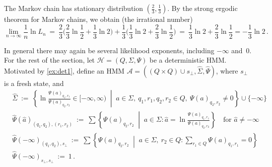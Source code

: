 \documentclass[a4paper,UKenglish,cleveref, autoref,mathscr]{lipics-v2019}
\newcommand{\1}{\mathbbm{1}}
\newcommand{\liexp}{\lim_{n\rightarrow\infty} \frac1n \ln L_n}
\newcommand{\A}{\mathcal{A}}
\renewcommand{\H}{\mathcal{H}}
\begin{document}
\begin{example}
%	
The Markov chain has stationary distribution $(\frac23, \frac13)$.
By the strong ergodic theorem for Markov chains, we obtain (the irrational number)
\[
\textstyle
\liexp \ =\ \frac23 \Big(\frac23 \ln \frac12 + \frac13 \ln 2 \Big) + \frac13 \Big(\frac13 \ln 2 + \frac23 \ln \frac12\Big) \ = \ \frac13 \ln2 + \frac23 \ln \frac12 = - \frac13 \ln2\,.
\]
\end{example}
In general there may again be several likelihood exponents, including $-\infty$ and~$0$.
For the rest of the section, let $\H = (Q,\Sigma,\Psi)$ be a deterministic HMM. %
Motivated by \cref{ex:det1}, define an HMM $\A = ((Q \times Q) \cup s_\bot, \hat\Sigma, \hat\Psi)$, where $s_\bot$ is a fresh state, and
\begin{align*}
&\hat\Sigma \ := \ \left\{\ln \frac{\Psi(a)_{q_1,r_1}}{\Psi(a)_{q_2,r_2}} \in [-\infty,\infty) \;\middle\vert\; a \in \Sigma,\ q_1,r_1,q_2,r_2 \in Q,\ \Psi(a)_{q_2,r_2} \ne 0 \right\} \cup \{-\infty\} \\
&\hat\Psi(\hat a)_{(q_1,q_2),(r_1,r_2)} \ := \ \sum \left\{\Psi(a)_{q_2,r_2} \;\middle\vert\; a \in \Sigma : \hat a = \ln \frac{\Psi(a)_{q_1,r_1}}{\Psi(a)_{q_2,r_2}} \right\} \quad \text{for } \hat a \ne -\infty \\
&\hat\Psi(-\infty)_{(q_1,q_2),s_\bot} \ := \ \sum \left\{\Psi(a)_{q_2,r_2} \;\middle\vert\; a \in \Sigma,\ r_2 \in Q : \textstyle\sum_{r_1 \in Q} \Psi(a)_{q_1,r_1} = 0 \right\}  \\
&\hat\Psi(-\infty)_{s_\bot,s_\bot} \ := \ 1\,.
\end{align*}
\end{document}
